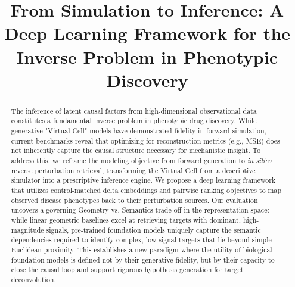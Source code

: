 \documentclass[conference]{IEEEtran}
\begin{document}
\title{From Simulation to Inference: A Deep Learning Framework for the Inverse Problem in Phenotypic Discovery}

\author{
\and
{}
\and
{}
\and
{}
}

\maketitle

\begin{abstract}
The inference of latent causal factors from high-dimensional observational data constitutes a fundamental inverse problem in phenotypic drug discovery. While generative "Virtual Cell" models have demonstrated fidelity in forward simulation, current benchmarks reveal that optimizing for reconstruction metrics (e.g., MSE) does not inherently capture the causal structure necessary for mechanistic insight. To address this, we reframe the modeling objective from forward generation to \textit{in silico} reverse perturbation retrieval, transforming the Virtual Cell from a descriptive simulator into a prescriptive inference engine. We propose a deep learning framework that utilizes control-matched delta embeddings and pairwise ranking objectives to map observed disease phenotypes back to their perturbation sources. Our evaluation uncovers a governing Geometry vs. Semantics trade-off in the representation space: while linear geometric baselines excel at retrieving targets with dominant, high-magnitude signals, pre-trained foundation models uniquely capture the semantic dependencies required to identify complex, low-signal targets that lie beyond simple Euclidean proximity. This establishes a new paradigm where the utility of biological foundation models is defined not by their generative fidelity, but by their capacity to close the causal loop and support rigorous hypothesis generation for target deconvolution.
\end{abstract}
\end{document}
